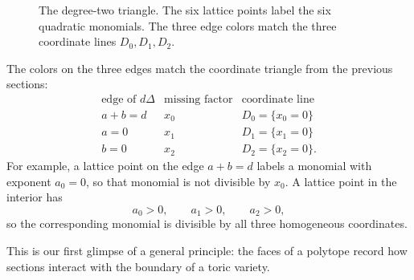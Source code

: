 \begin{figure}[ht]
\centering
{}
\caption{The degree-two triangle. The six lattice points label the six
quadratic monomials. The three edge colors match the three coordinate
lines \(D_0,D_1,D_2\).}
\label{fig:p2-degree-two-monomials}
\end{figure}

The colors on the three edges match the coordinate triangle from the
previous sections:
\[
\begin{array}{c|c|c}
\text{edge of }d\Delta
&
\text{missing factor}
&
\text{coordinate line}
\\
\hline
a+b=d & x_0 & D_0=\{x_0=0\}\\
a=0 & x_1 & D_1=\{x_1=0\}\\
b=0 & x_2 & D_2=\{x_2=0\}.
\end{array}
\]
For example, a lattice point on the edge \(a+b=d\) labels a monomial
with exponent \(a_0=0\), so that monomial is not divisible by \(x_0\).
A lattice point in the interior has
\[
a_0>0,\qquad a_1>0,\qquad a_2>0,
\]
so the corresponding monomial is divisible by all three homogeneous
coordinates.

This is our first glimpse of a general principle: the faces of a
polytope record how sections interact with the boundary of a toric
variety.

